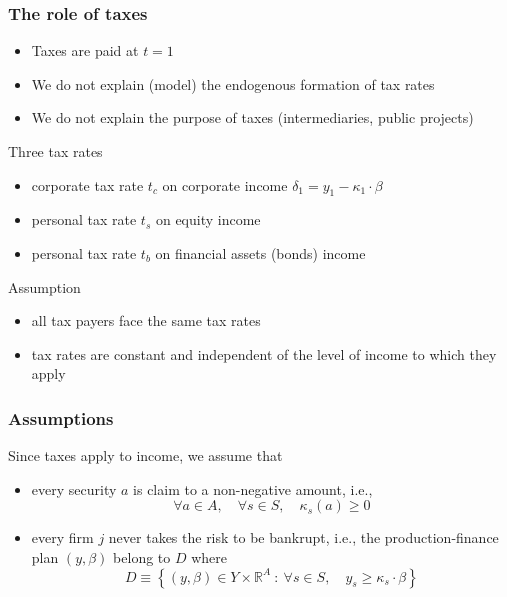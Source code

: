 \documentclass[blue]{beamer}
\def\R{\mathbb{R}}
\def\geq{\geqslant}
\theoremstyle{definition}
\theoremstyle{example}
\begin{document}

\begin{frame}\frametitle{The role of taxes}

\begin{itemize}
\item Taxes are paid at $t=1$
\item We do not explain (model) the endogenous formation of tax rates
\item We do not explain the purpose of taxes (intermediaries, public projects)
\end{itemize}

\begin{block}{Three tax rates}
\begin{itemize}
\item corporate tax rate $t_c$ on corporate income $\delta_1= y_1 - \kappa_1 \cdot \beta$
\item personal tax rate $t_s$ on equity income
\item personal tax rate $t_b$ on financial assets (bonds) income
\end{itemize}
\end{block}

\begin{block}{Assumption}
\begin{itemize}
\item all tax payers face the same tax rates
\item tax rates are constant and independent of the level of income to which they apply
\end{itemize}
\end{block}

\end{frame}


\begin{frame}\frametitle{Assumptions}

Since taxes apply to income, we assume that
\begin{itemize}
\item every security $a$ is claim to a non-negative amount, i.e.,
\[
\forall a \in A, \quad \forall s\in S, \quad \kappa_s(a) \geq 0
\]
\item every firm $j$ never takes the risk to be bankrupt, i.e., the production-finance plan $(y,\beta)$ belong to $D$ where
\[
D \equiv \left\{ (y,\beta) \in Y \times \R^A \ \colon \ \forall s\in S, \quad y_s \geq \kappa_s \cdot \beta \right\}
\]
\end{itemize}

\end{frame}
\end{document}
